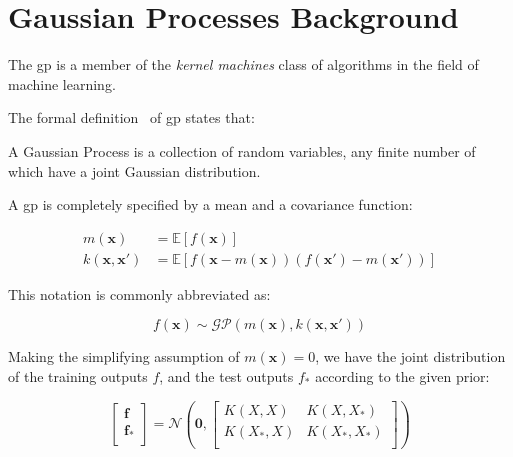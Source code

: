 \section{Gaussian Processes Background}

The \acrfull{gp} is a member of the \textit{kernel machines} class of algorithms
in the field of machine learning.

The formal definition~\cite{rasmussenGaussianProcessesMachine2006} of
\acrlong{gp} states that:


\begin{displayquote}
    A Gaussian Process is a collection of random variables, any finite number of
    which have a joint Gaussian distribution.
\end{displayquote}

A \acrshort{gp} is completely specified by a mean and a covariance function:

\begin{equation}
    \begin{aligned}
        m(\mathbf{x}) &= \mathbb{E}[f(\mathbf{x})] \\
        k(\mathbf{x}, \mathbf{x'}) &= \mathbb{E}[f(\mathbf{x} -
        m(\mathbf{x}))(f(\mathbf{x'}) - m(\mathbf{x'}))]
    \end{aligned}
\end{equation}

This notation is commonly abbreviated as:

\begin{equation}
    f(\mathbf{x}) \sim \mathcal{GP}(m(\mathbf{x}), k(\mathbf{x}, \mathbf{x'}))
\end{equation}

Making the simplifying assumption of $m(\mathbf{x}) = 0$, we have the joint
distribution of the training outputs $f$, and the test outputs $f_*$ according
to the given prior:

\begin{equation}
    \begin{bmatrix}
        \mathbf{f} \\
        \mathbf{f_*} \\
    \end{bmatrix} = 
    \mathcal{N}\left(
        \mathbf{0}, 
        \begin{bmatrix}
            K(X, X) & K(X, X_*) \\
            K(X_*, X) & K(X_*, X_*) \\
        \end{bmatrix}
    \right)
\end{equation}

